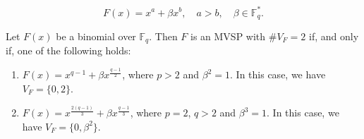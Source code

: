 \documentclass[10pt,a4paper]{amsart}
\begin{document}
\begin{equation}\label{eq:binomial-equation}
F(x) = x^a + \beta x^b, \quad a > b, \quad \beta \in \mathbb{F}_q^*.
\end{equation}

\begin{proposition}\label{Vf=2}
    Let $F(x)$ be a binomial over $\mathbb{F}_q$. Then $F$ is an MVSP with $\# V_F = 2$ if, and only if, one of the following holds:
    \begin{enumerate}
        \item[$\mathrm{(i)}$] $F(x) = x^{q-1} + \beta x^{\frac{q-1}{2}}$, where $p > 2$ and $\beta^2 =1$. In this case, we have $V_F = \{0, 2\}$.
        \item[$\mathrm{(ii)}$] $F(x) = x^{\frac{2(q-1)}{3}} + \beta x^{\frac{q-1}{3}}$, where $p = 2$, $q > 2$ and $\beta^3 = 1$. In this case, we have $V_F = \{0, \beta^2\}$.
    \end{enumerate}
\end{proposition}
\end{document}
